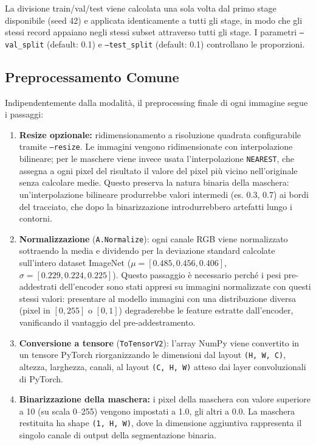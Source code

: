 La divisione train/val/test viene calcolata una sola volta dal primo stage disponibile (seed 42) e applicata identicamente a tutti gli stage, in modo che gli stessi record appaiano negli stessi subset attraverso tutti gli stage. I parametri \texttt{--val\_split} (default: 0.1) e \texttt{--test\_split} (default: 0.1) controllano le proporzioni.

\subsection{Preprocessamento Comune}

Indipendentemente dalla modalità, il preprocessing finale di ogni immagine segue i passaggi:

\begin{enumerate}
    \item \textbf{Resize opzionale:} ridimensionamento a risoluzione quadrata configurabile tramite \texttt{--resize}. Le immagini vengono ridimensionate con interpolazione bilineare; per le maschere viene invece usata l'interpolazione \texttt{NEAREST}, che assegna a ogni pixel del risultato il valore del pixel più vicino nell'originale senza calcolare medie. Questo preserva la natura binaria della maschera: un'interpolazione bilineare produrrebbe valori intermedi (es. 0.3, 0.7) ai bordi del tracciato, che dopo la binarizzazione introdurrebbero artefatti lungo i contorni.
    \item \textbf{Normalizzazione} (\texttt{A.Normalize}): ogni canale RGB viene normalizzato sottraendo la media e dividendo per la deviazione standard calcolate sull'intero dataset ImageNet ($\mu = [0.485, 0.456, 0.406]$, $\sigma = [0.229, 0.224, 0.225]$). Questo passaggio è necessario perché i pesi pre-addestrati dell'encoder sono stati appresi su immagini normalizzate con questi stessi valori: presentare al modello immagini con una distribuzione diversa (pixel in $[0, 255]$ o $[0, 1]$) degraderebbe le feature estratte dall'encoder, vanificando il vantaggio del pre-addestramento.
    \item \textbf{Conversione a tensore} (\texttt{ToTensorV2}): l'array NumPy viene convertito in un tensore PyTorch riorganizzando le dimensioni dal layout \texttt{(H, W, C)}, altezza, larghezza, canali, al layout \texttt{(C, H, W)} atteso dai layer convoluzionali di PyTorch.
    \item \textbf{Binarizzazione della maschera:} i pixel della maschera con valore superiore a 10 (su scala 0–255) vengono impostati a 1.0, gli altri a 0.0. La maschera restituita ha shape \texttt{(1, H, W)}, dove la dimensione aggiuntiva rappresenta il singolo canale di output della segmentazione binaria.
\end{enumerate}

